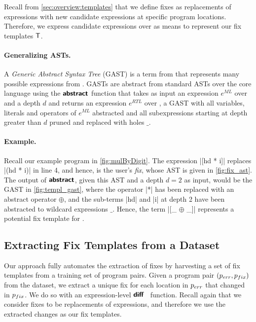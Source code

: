 Recall from \autoref{sec:overview:templates} that we define fixes as
replacements of expressions with new candidate expressions at specific program
locations. Therefore, we express candidate expressions over \repairLang as means
to represent our fix templates $\mathsf{T}$.

\paragraph{Generalizing ASTs.}
A \emph{Generic Abstract Syntax Tree} (GAST) is a term from \repairLang that
represents many possible expressions from \lang. GASTs are abstract from
standard ASTs over the core language \lang using the $\bm{\mathsf{abstract}}$ function that
takes as input an expression $e^{ML}$ over \lang and a depth $d$ and returns an
expression $e^{RTL}$ over \repairLang, \ie a GAST with all variables, literals
and operators of $e^{ML}$ abstracted and all subexpressions starting at depth
greater than $d$ pruned and replaced with holes $\_$.



\paragraph{Example.}
Recall our example program \mbd in \autoref{fig:mulByDigit}.
%
The expression |[hd * i]| replaces |(hd * i)| in line 4, and hence, is the
user's \emph{fix}, whose AST is given in \autoref{fig:fix_ast}.
%
The output of $\bm{\mathsf{abstract}}$, given this AST and a depth $d = 2$ as input, would be
the GAST in \autoref{fig:templ_gast}, where the operator |*| has been replaced
with an abstract operator $\oplus$, and the sub-terms |hd| and |i| at depth 2
have been abstracted to wildcard expressions $\_$.
%
Hence, the \repairLang term |[_ $\oplus$ _]| represents a potential fix template
for \mbd.

\subsection{Extracting Fix Templates from a Dataset}
\label{sec:templ-partition:templates}

Our approach fully automates the extraction of fixes by harvesting a set of fix
templates from a training set of program pairs.
%
Given a program pair $(p_{err}, p_{fix})$ from the dataset, we extract a unique fix
for each location in $p_{err}$ that changed in $p_{fix}$.
%
We do so with an expression-level $\bm{\mathsf{diff}}$~\citep{Lempsink2009-xf} function.
%
Recall again that we consider fixes to be replacements of expressions, and
therefore we use the extracted changes as our fix templates.

